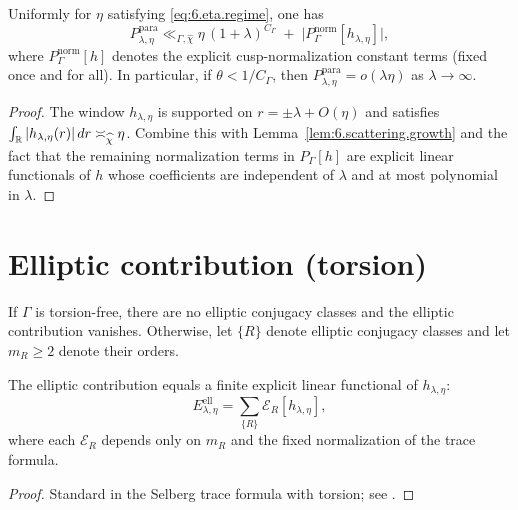 \begin{proposition}\label{prop:6.parabolic.bound}
Uniformly for $\eta$ satisfying \eqref{eq:6.eta.regime}, one has
\begin{equation}\label{eq:6.parabolic.bound}
P_{\lambda,\eta}^{\mathrm{para}}
\ll_{\Gamma,\widehat\chi}
\eta\,(1+\lambda)^{C_\Gamma}
\;+\;\big|P_\Gamma^{\mathrm{norm}}[h_{\lambda,\eta}]\big|,
\end{equation}
where $P_\Gamma^{\mathrm{norm}}[h]$ denotes the explicit cusp-normalization constant terms (fixed once and for all).
In particular, if $\theta<1/C_\Gamma$, then $P_{\lambda,\eta}^{\mathrm{para}}=o(\lambda\eta)$ as $\lambda\to\infty$.
\end{proposition}

\begin{proof}
The window $h_{\lambda,\eta}$ is supported on $r=\pm\lambda+O(\eta)$ and satisfies
$\int_{\mathbb{R}} |h_{\lambda,\eta}(r)|\,dr\asymp_{\widehat\chi}\eta$.
Combine this with Lemma~\ref{lem:6.scattering.growth} and the fact that the remaining normalization terms in
$P_\Gamma[h]$ are explicit linear functionals of $h$ whose coefficients are independent of $\lambda$ and at most
polynomial in $\lambda$.
\end{proof}

\section{Elliptic contribution (torsion)}
\label{sec:ch6-elliptic}

If $\Gamma$ is torsion-free, there are no elliptic conjugacy classes and the elliptic contribution vanishes.
Otherwise, let $\{R\}$ denote elliptic conjugacy classes and let $m_R\ge 2$ denote their orders.

\begin{lemma}\label{lem:6.elliptic.form}
The elliptic contribution equals a finite explicit linear functional of $h_{\lambda,\eta}$:
\begin{equation}\label{eq:6.elliptic.form}
E_{\lambda,\eta}^{\mathrm{ell}}
=\sum_{\{R\}} \mathcal E_R[h_{\lambda,\eta}],
\end{equation}
where each $\mathcal E_R$ depends only on $m_R$ and the fixed normalization of the trace formula.
\end{lemma}

\begin{proof}
Standard in the Selberg trace formula with torsion; see \cite[Vol.~I, Ch.~2]{Hejhal1983}.
\end{proof}

